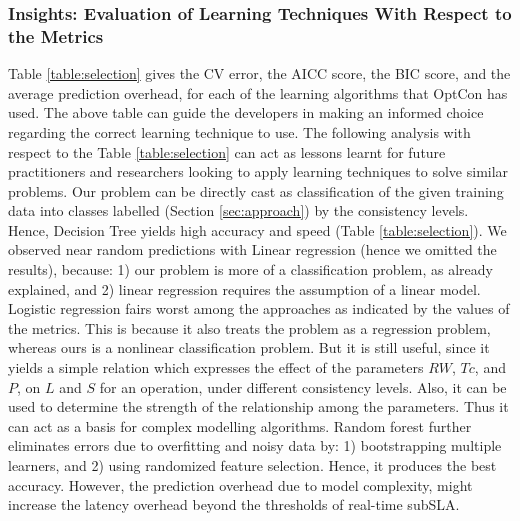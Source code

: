 \documentclass[conference]{IEEEtran}
\begin{document}
  \subsubsection{Insights: Evaluation of Learning Techniques With Respect to the Metrics}\label{sec:compareresults}
  \begin{table}[!htb]
\caption{Model Selection Results: As per descending order of AICC and BIC, and ascending order of CV and Overhead}
\label{table:selection}
\end{table}
Table \ref{table:selection} gives the CV error, the AICC score, the BIC score, and the average prediction overhead, for each of the learning algorithms that OptCon has used.
   The above table can guide the developers in making an informed choice regarding the correct learning technique to use. The following analysis with respect to the Table \ref{table:selection} can act as lessons learnt for future practitioners and researchers looking to apply learning techniques to solve similar problems.
    Our problem can be directly cast as classification of the given training data into classes labelled (Section \ref{sec:approach}) by the consistency levels. Hence, Decision Tree yields high accuracy and speed (Table \ref{table:selection}). We observed near random predictions with Linear regression (hence we omitted the results),  because: 1) our problem is more of a classification problem, as already explained, and 2) linear regression requires the assumption of a linear model. Logistic regression fairs worst among the approaches as indicated by the values of the metrics. This is because it also treats the problem as a  regression problem,  whereas ours is a nonlinear classification problem. But it is still useful, since it yields a simple relation which expresses the effect of the parameters $RW$, $Tc$, and $P$, on $L$ and $S$ for an operation, under different consistency levels. Also, it can be used to determine the strength of the relationship among the parameters. Thus it can act as a basis for complex modelling algorithms. Random forest further eliminates errors due to overfitting and noisy data by: 1) bootstrapping multiple learners,  and 2) using randomized feature selection. Hence, it produces the best accuracy. However, the prediction overhead due to model complexity, might increase the latency overhead beyond the thresholds of real-time subSLA.
\end{document}
